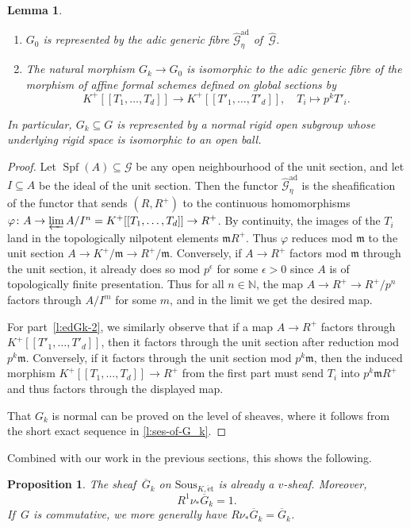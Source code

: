 \documentclass[10pt,a4paper]{article}
\newtheorem{Lemma}[thm]{Lemma}
\newtheorem{Proposition}[thm]{Proposition}
\theoremstyle{definition}
\theoremstyle{remark}
\newcommand{\lra}{\longrightarrow}
\newcommand{\wh}{\widehat}
\newcommand{\N}{\mathbb{N}}
\newcommand{\m}{\mathfrak{m}}
\newcommand{\et}{{\operatorname{\acute{e}t}}}
\newcommand{\ad}{\mathrm{ad}}
\newcommand{\Spf}{\operatorname{Spf}}
\newcommand{\mG}{\mathcal{G}}
\newcommand{\Sous}{\mathrm{Sous}}
\numberwithin{equation}{section}
\begin{document}
\begin{Lemma}\label{l:explicit-description-of-G_k}\leavevmode
	\begin{enumerate}
		\item $G_0$ is represented by the adic generic fibre  $\wh{\mG}^{\ad}_{\eta}$ of\, $\wh{\mG}$.
		\item\label{l:edGk-2} The natural morphism $G_k\to G_0$ is isomorphic to the adic generic fibre of the morphism of affine formal schemes defined on global sections by
		\[ K^+[[T_1,\dots,T_d]]\lra K^+[[T'_1,\dots,T'_d]],\quad T_i\longmapsto p^kT'_i.\]
	\end{enumerate}
	In particular, $G_k\subseteq G$ is represented by a normal rigid open subgroup whose underlying rigid space is isomorphic to an open ball.
\end{Lemma}

\begin{proof}
	Let $\Spf(A)\subseteq \mG$ be any open neighbourhood of the unit section, and let $I\subseteq A$ be the ideal of the unit section. Then the functor $\wh{\mG}^{\ad}_{\eta}$ is the sheafification of the functor that sends  $(R,R^+)$ to the continuous homomorphisms $\varphi\colon A\to \varprojlim A/I^n=K^+[[T_1,\dots,T_d]]\to R^+$. By continuity, the images of the $T_i$ land in the topologically nilpotent elements $\m R^+$. Thus $\varphi$ reduces mod $\m$ to the unit section $A\to K^+/\m \to R^+/\m$. Conversely, if $A\to R^+$ factors mod $\m$ through the unit section, it already does so mod $p^{\epsilon}$ for some $\epsilon>0$ since $A$ is of topologically finite presentation. Thus for all $n\in \N$, the map $A\to R^+\to R^+/p^n$ factors through $A/I^m$ for some $m$, and in the limit we get the desired map.
	
	For part~\eqref{l:edGk-2}, we similarly observe that if a map $A\to R^+$ factors through $K^+[[T'_1,\dots,T'_d]]$, then it factors through the unit section after reduction mod $p^k\m$. Conversely, if it factors through the unit section mod $p^k\m$, then the induced morphism $K^+[[T_1,\dots,T_d]]\to R^+$ from the first part must send $T_i$ into $p^k\m R^+$ and thus factors through the displayed map.
	
	That $G_k$ is normal can be proved on the level of sheaves, where it follows from the short exact sequence in \cref{l:ses-of-G_k}.
\end{proof}

Combined with our work in the previous sections, this shows the following. 

\begin{Proposition}\label{l:cohomo-comp-G^+/G^+_c}
	The sheaf\, $\overline G_{k}$ on $\Sous_{K,\et}$ is already a $v$-sheaf. Moreover,
	\[ R^1\nu_{\ast}\overline G_k=1.\]
	If\, $G$ is commutative,  we more generally have $R\nu_{\ast}\overline G_{k}=\overline G_{k}$.
\end{Proposition}
\end{document}
